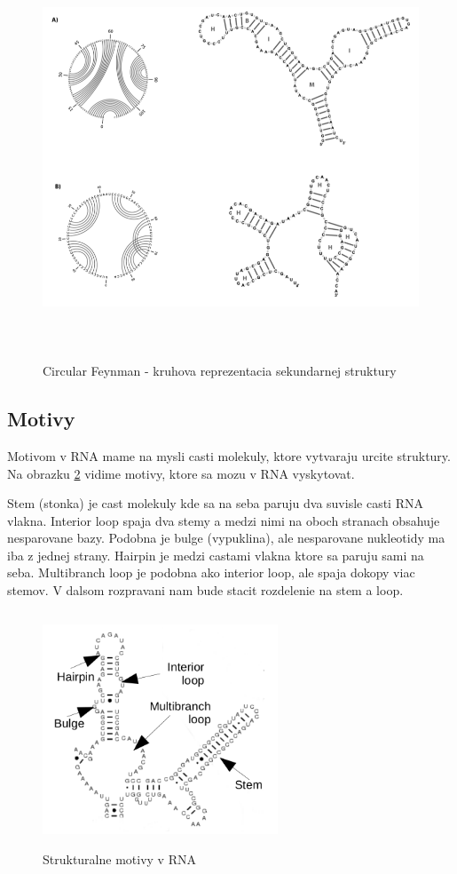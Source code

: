 \begin{figure}[H]
\centering
\includegraphics[width=140mm, height=120mm]{../img/RNA_circular_reprezentation.png}
\caption{Circular Feynman - kruhova reprezentacia sekundarnej struktury}
\label{obr:RNA_circular_representation}
\end{figure}


\subsection{Motivy}

Motivom v RNA mame na mysli casti molekuly, ktore vytvaraju urcite struktury.
Na obrazku \ref{obr:RNA_motifs} vidime motivy, ktore sa mozu v RNA vyskytovat.

Stem (stonka) je cast molekuly kde sa na seba paruju dva suvisle casti RNA vlakna.
Interior loop spaja dva stemy a medzi nimi na oboch stranach obsahuje nesparovane
bazy. Podobna je bulge (vypuklina), ale nesparovane nukleotidy ma iba z jednej strany.
Hairpin je medzi castami vlakna ktore sa paruju sami na seba.
Multibranch loop je podobna ako interior loop, ale spaja dokopy viac stemov.
V dalsom rozpravani nam bude stacit rozdelenie na stem a loop.


\begin{figure}[H]
\centering
\includegraphics[width=70mm, height=70mm]{../img/struktury_v_rna.png}
\caption{Strukturalne motivy v RNA}
\label{obr:RNA_motifs}
\end{figure}










